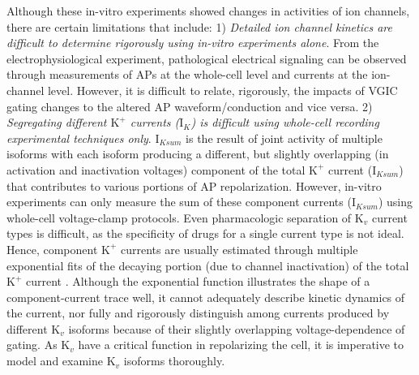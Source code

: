 \documentclass[10pt,letterpaper]{article}
\begin{document}
Although these in-vitro experiments showed changes in activities of ion channels, there are certain limitations that include: 1) \textit{Detailed ion channel kinetics are difficult to determine rigorously using in-vitro experiments alone}. From the electrophysiological experiment, pathological electrical signaling can be observed through measurements of APs at the whole-cell level and currents at the ion-channel level. However, it is difficult to relate, rigorously, the impacts of VGIC gating changes to the altered AP waveform/conduction and vice versa. 2) \textit{Segregating different $\text{K}^{+}$ currents ($\text{I}_{K}$) is difficult using whole-cell recording experimental techniques only}. $\text{I}_{Ksum}$ is the result of joint activity of multiple isoforms with each isoform producing a different, but slightly overlapping (in activation and inactivation voltages) component of the total $\text{K}^{+}$ current ($\text{I}_{Ksum}$) \cite{du2017} that contributes to various portions of AP repolarization. However, in-vitro experiments can only measure the sum of these component currents ($\text{I}_{Ksum}$) using whole-cell voltage-clamp protocols. Even pharmacologic separation of $\text{K}_{v}$ current types is difficult, as the specificity of drugs for a single current type is not ideal. Hence, component $\text{K}^{+}$ currents are usually estimated through multiple exponential fits of the decaying portion (due to channel inactivation) of the total $\text{K}^{+}$ current \cite{brunet2004heterogeneous}. Although the exponential function illustrates the shape of a component-current trace well, it cannot adequately describe kinetic dynamics of the current, nor fully and rigorously distinguish among currents produced by different $\text{K}_{v}$ isoforms because of their slightly overlapping voltage-dependence of gating. As $\text{K}_{v}$ have a critical function in repolarizing the cell, it is imperative to model and examine $\text{K}_{v}$ isoforms thoroughly.
\end{document}
